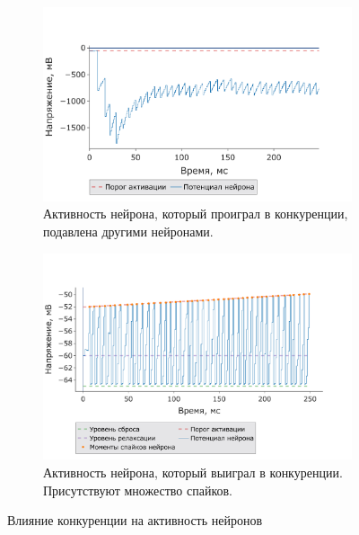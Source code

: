 \documentclass[a4paper]{article}
\begin{document}
\begin{figure}[H]
\centering
\begin{subfigure}{0.95\textwidth} 
    \includegraphics[width=\textwidth,keepaspectratio=true]{bad_voltage_ru.pdf}
    \caption{Активность нейрона, который проиграл в конкуренции, подавлена другими нейронами.
    } 
\end{subfigure}
\begin{subfigure}{0.95\textwidth}
    \includegraphics[width=\textwidth,keepaspectratio=true]{good_voltage_ru.pdf}
    \caption{Активность нейрона, который выиграл в конкуренции. Присутствуют множество спайков.}
\end{subfigure}
\caption{Влияние конкуренции на активность нейронов\\
}
\end{figure} 
\end{document}
